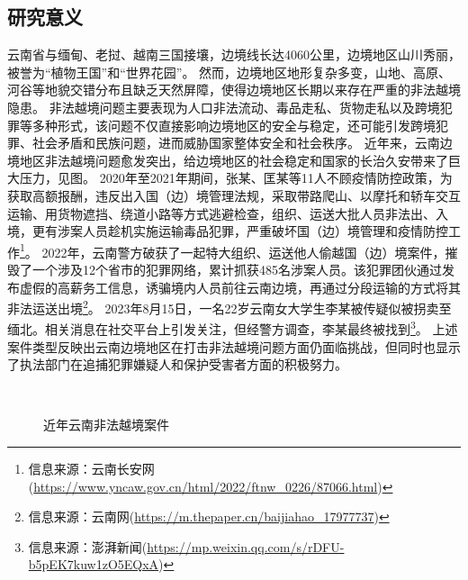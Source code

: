 \subsection{研究意义}

云南省与缅甸、老挝、越南三国接壤，边境线长达4060公里，边境地区山川秀丽，被誉为“植物王国”和“世界花园”。
然而，边境地区地形复杂多变，山地、高原、河谷等地貌交错分布且缺乏天然屏障，使得边境地区长期以来存在严重的非法越境隐患。
非法越境问题主要表现为人口非法流动、毒品走私、货物走私以及跨境犯罪等多种形式，该问题不仅直接影响边境地区的安全与稳定，还可能引发跨境犯罪、社会矛盾和民族问题，进而威胁国家整体安全和社会秩序。
近年来，云南边境地区非法越境问题愈发突出，给边境地区的社会稳定和国家的长治久安带来了巨大压力，见图。
2020年至2021年期间，张某、匡某等11人不顾疫情防控政策，为获取高额报酬，违反出入国（边）境管理法规，采取带路爬山、以摩托和轿车交互运输、用货物遮挡、绕道小路等方式逃避检查，组织、运送大批人员非法出、入境，更有涉案人员趁机实施运输毒品犯罪，严重破坏国（边）境管理和疫情防控工作\footnote{信息来源：云南长安网(\url{https://www.yncaw.gov.cn/html/2022/ftnw_0226/87066.html})}。
2022年，云南警方破获了一起特大组织、运送他人偷越国（边）境案件，摧毁了一个涉及12个省市的犯罪网络，累计抓获485名涉案人员。该犯罪团伙通过发布虚假的高薪务工信息，诱骗境内人员前往云南边境，再通过分段运输的方式将其非法运送出境\footnote{信息来源：云南网(\url{https://m.thepaper.cn/baijiahao_17977737})}。
2023年8月15日，一名22岁云南女大学生李某被传疑似被拐卖至缅北。相关消息在社交平台上引发关注，但经警方调查，李某最终被找到\footnote{信息来源：澎湃新闻(\url{https://mp.weixin.qq.com/s/rDFU-b5pEK7kuw1zO5EQxA})}。
上述案件类型反映出云南边境地区在打击非法越境问题方面仍面临挑战，但同时也显示了执法部门在追捕犯罪嫌疑人和保护受害者方面的积极努力。

\begin{figure}[h!]
\centering %
\subfloat[``1·24"非法越境案件]{
	\texttt{[image: 1]}
}
\subfloat[2022特大非法越境案件]{
	\texttt{[image: 2]}
}\\
\captionsetup{justification=centering} %
\caption{近年云南非法越境案件}
\label{fig:case-}
\end{figure}


